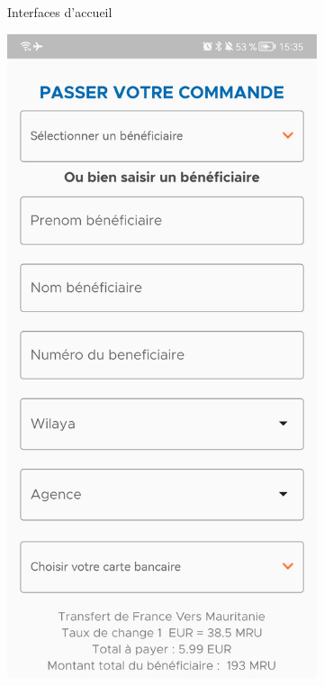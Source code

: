 \begin{itemize}[label=$\ast$]
\begin{figure}
\begin{subfigure}[b]{0.3\textwidth}
		\caption{Interfaces d'accueil}
		\label{fig:y equals x}
	\end{subfigure}
	\hfill
	\begin{subfigure}[b]{0.3\textwidth}
		\centering
		\includegraphics[width=\textwidth]{./Template LaTeX/Images/11.jpg}

\end{subfigure}
\end{figure}
\end{itemize}
